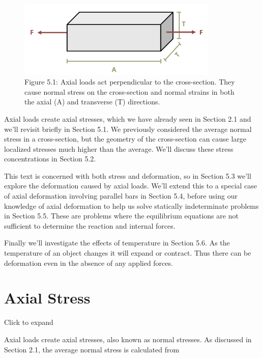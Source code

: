 \documentclass[
  letterpaper,
  DIV=11,
  numbers=noendperiod]{scrreprt}
\begin{document}
\begin{figure}[H]

{\centering \includegraphics[width=3.76042in,height=\textheight]{images/PNGs/Figure 5.1.png}

}

\caption{Figure 5.1: Axial loads act perpendicular to the cross-section.
They cause normal stress on the cross-section and normal strains in both
the axial (A) and transverse (T) directions.}

\end{figure}%

Axial loads create axial stresses, which we have already seen in Section
2.1 and we'll revisit briefly in Section 5.1. We previously considered
the average normal stress in a cross-section, but the geometry of the
cross-section can cause large localized stresses much higher than the
average. We'll discuss these stress concentrations in Section 5.2.

This text is concerned with both stress and deformation, so in Section
5.3 we'll explore the deformation caused by axial loads. We'll extend
this to a special case of axial deformation involving parallel bars in
Section 5.4, before using our knowledge of axial deformation to help us
solve statically indeterminate problems in Section 5.5. These are
problems where the equilibrium equations are not sufficient to determine
the reaction and internal forces.

Finally we'll investigate the effects of temperature in Section 5.6. As
the temperature of an object changes it will expand or contract. Thus
there can be deformation even in the absence of any applied forces.

\section{Axial Stress}\label{axial-stress}

Click to expand

Axial loads create axial stresses, also known as normal stresses. As
discussed in Section 2.1, the average normal stress is calculated from
\end{document}
